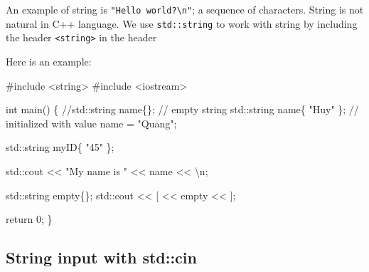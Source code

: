 \documentclass[
  letterpaper,
  DIV=11,
  numbers=noendperiod]{scrreprt}
\newenvironment{Shaded}{\begin{snugshade}}{\end{snugshade}}
\newcommand{\CommentTok}[1]{\textcolor[rgb]{0.37,0.37,0.37}{#1}}
\newcommand{\DecValTok}[1]{\textcolor[rgb]{0.68,0.00,0.00}{#1}}
\newcommand{\ErrorTok}[1]{\textcolor[rgb]{0.68,0.00,0.00}{#1}}
\newcommand{\FunctionTok}[1]{\textcolor[rgb]{0.28,0.35,0.67}{#1}}
\newcommand{\NormalTok}[1]{\textcolor[rgb]{0.00,0.23,0.31}{#1}}
\newcommand{\OtherTok}[1]{\textcolor[rgb]{0.00,0.23,0.31}{#1}}
\newcommand{\SpecialCharTok}[1]{\textcolor[rgb]{0.37,0.37,0.37}{#1}}
\newcommand{\StringTok}[1]{\textcolor[rgb]{0.13,0.47,0.30}{#1}}
\begin{document}
An example of string is \texttt{"Hello\ world?\textbackslash{}n"}; a
sequence of characters. String is not natural in C++ language. We use
\texttt{std::string} to work with string by including the header
\texttt{\textless{}string\textgreater{}} in the header

Here is an example:

\begin{Shaded}
\begin{Highlighting}[]
\CommentTok{\#include \textless{}string\textgreater{}}
\CommentTok{\#include \textless{}iostream\textgreater{}}

\NormalTok{int }\FunctionTok{main}\NormalTok{()}
\NormalTok{\{}
    \SpecialCharTok{/}\ErrorTok{/}\NormalTok{std}\SpecialCharTok{::}\NormalTok{string name\{\};       }\SpecialCharTok{/}\ErrorTok{/}\NormalTok{ empty string}
\NormalTok{    std}\SpecialCharTok{::}\NormalTok{string name\{ }\StringTok{"Huy"}\NormalTok{ \};      }\SpecialCharTok{/}\ErrorTok{/}\NormalTok{ initialized with value}
\NormalTok{    name }\OtherTok{=} \StringTok{"Quang"}\NormalTok{;}

\NormalTok{    std}\SpecialCharTok{::}\NormalTok{string myID\{ }\StringTok{"45"}\NormalTok{ \};}

\NormalTok{    std}\SpecialCharTok{::}\NormalTok{cout }\SpecialCharTok{\textless{}}\ErrorTok{\textless{}} \StringTok{"My name is "} \SpecialCharTok{\textless{}}\ErrorTok{\textless{}}\NormalTok{ name }\SpecialCharTok{\textless{}}\ErrorTok{\textless{}} \StringTok{\textquotesingle{}}\SpecialCharTok{\textbackslash{}n}\StringTok{\textquotesingle{}}\NormalTok{;}

\NormalTok{    std}\SpecialCharTok{::}\NormalTok{string empty\{\};}
\NormalTok{    std}\SpecialCharTok{::}\NormalTok{cout }\SpecialCharTok{\textless{}}\ErrorTok{\textless{}} \StringTok{\textquotesingle{}[\textquotesingle{}} \SpecialCharTok{\textless{}}\ErrorTok{\textless{}}\NormalTok{ empty }\SpecialCharTok{\textless{}}\ErrorTok{\textless{}} \StringTok{\textquotesingle{}]\textquotesingle{}}\NormalTok{;}

\NormalTok{    return }\DecValTok{0}\NormalTok{;}
\NormalTok{\}}
\end{Highlighting}
\end{Shaded}

\hypertarget{string-input-with-stdcin}{%
\subsection{String input with std::cin}\label{string-input-with-stdcin}}
\end{document}

